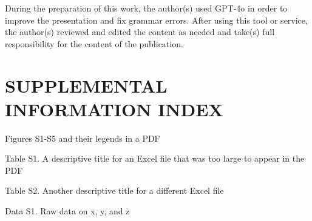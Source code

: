 \documentclass[12pt,letterpaper]{article}
\begin{document}
During the preparation of this work, the author(s) used GPT-4o in order to improve the presentation and fix grammar errors. After using this tool or service, the author(s) reviewed and edited the content as needed and take(s) full responsibility for the content of the publication.

\section*{SUPPLEMENTAL INFORMATION INDEX}




\begin{description}
  \item Figures S1-S5 and their legends in a PDF
  \item Table S1. A descriptive title for an Excel file that was too large to appear in the PDF
  \item Table S2. Another descriptive title for a different Excel file
  \item Data S1. Raw data on x, y, and z
\end{description}







\bigskip

\end{document}
